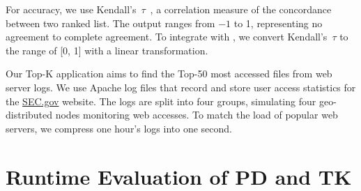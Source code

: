 \documentclass[twocolumn, 9pt]{article}
\begin{document}
For accuracy, we use Kendall's~$\tau$~\cite{abdi2007kendall}, a correlation
measure of the concordance between two ranked list. The output ranges from
\(-1\) to 1, representing no agreement to complete agreement. To integrate with
\sysname{}, we convert Kendall's~$\tau$ to the range of [0, 1] with a linear
transformation.

Our Top-K application aims to find the Top-50 most accessed files from web
server logs. We use Apache log files that record and store user access
statistics for the \href{https://www.sec.gov}{SEC.gov} website. The logs are
split into four groups, simulating four geo-distributed nodes monitoring web
accesses. To match the load of popular web servers, we compress one hour's logs
into one second.

\section{Runtime Evaluation of PD and TK}
\label{appendix:more-runtime}
\end{document}
